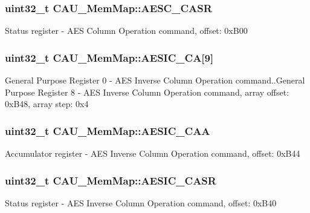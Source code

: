 \subsubsection[{A\+E\+S\+C\+\_\+\+C\+A\+S\+R}]{\setlength{\rightskip}{0pt plus 5cm}uint32\+\_\+t C\+A\+U\+\_\+\+Mem\+Map\+::\+A\+E\+S\+C\+\_\+\+C\+A\+S\+R}\label{struct_c_a_u___mem_map_aef9ec16f001c68f0f8584424c78a8a3c}
Status register -\/ A\+E\+S Column Operation command, offset\+: 0x\+B00 \hypertarget{struct_c_a_u___mem_map_a4e79ec8ba96bcf899cbb19207a23b160}{}
\subsubsection[{A\+E\+S\+I\+C\+\_\+\+C\+A}]{\setlength{\rightskip}{0pt plus 5cm}uint32\+\_\+t C\+A\+U\+\_\+\+Mem\+Map\+::\+A\+E\+S\+I\+C\+\_\+\+C\+A\mbox{[}9\mbox{]}}\label{struct_c_a_u___mem_map_a4e79ec8ba96bcf899cbb19207a23b160}
General Purpose Register 0 -\/ A\+E\+S Inverse Column Operation command..General Purpose Register 8 -\/ A\+E\+S Inverse Column Operation command, array offset\+: 0x\+B48, array step\+: 0x4 \hypertarget{struct_c_a_u___mem_map_a3a0b8c211ff4b16a8a82d63c2ce98a1f}{}
\subsubsection[{A\+E\+S\+I\+C\+\_\+\+C\+A\+A}]{\setlength{\rightskip}{0pt plus 5cm}uint32\+\_\+t C\+A\+U\+\_\+\+Mem\+Map\+::\+A\+E\+S\+I\+C\+\_\+\+C\+A\+A}\label{struct_c_a_u___mem_map_a3a0b8c211ff4b16a8a82d63c2ce98a1f}
Accumulator register -\/ A\+E\+S Inverse Column Operation command, offset\+: 0x\+B44 \hypertarget{struct_c_a_u___mem_map_a87bb091918313f2fb45656cefbc89338}{}
\subsubsection[{A\+E\+S\+I\+C\+\_\+\+C\+A\+S\+R}]{\setlength{\rightskip}{0pt plus 5cm}uint32\+\_\+t C\+A\+U\+\_\+\+Mem\+Map\+::\+A\+E\+S\+I\+C\+\_\+\+C\+A\+S\+R}\label{struct_c_a_u___mem_map_a87bb091918313f2fb45656cefbc89338}
Status register -\/ A\+E\+S Inverse Column Operation command, offset\+: 0x\+B40 \hypertarget{struct_c_a_u___mem_map_aedfa93977c4f622bd7bc6c223a02f9c2}{}
